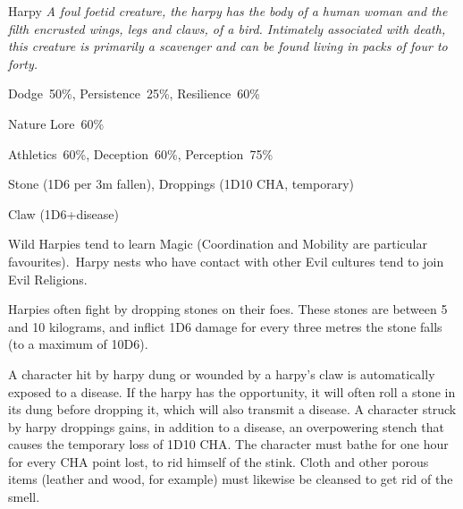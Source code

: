\begin{monsterbox}{Harpy}
	\textit{A foul foetid creature, the harpy has the body of a human woman and the filth encrusted wings, legs and claws, of a bird. Intimately associated with death, this creature is primarily a scavenger and can be found living in packs of four to forty.}\\
	\rpghline
	\basics[%
        hitpoints  = 9,
	majorwound = 5,
	damagemodifier = 0,
	powerpoints = 11,
	movementrate = {15m, 30m when flying},
	armor = None,
	plunderrating = 3
	]
	\rpghline%
	\stats[ %
		STR = 3D6    (11),
		CON = 3D6    (11),
		DEX = 5D6    (18),
		SIZ = 2D6    (7),
		INT = 3D6    (11),
		POW = 3D6    (11),
		CHA = 1D6    (4)
	]
	\rpghline%
	\begin{rpg-monsteraction}[Resistances]
		Dodge~50\%, Persistence~25\%, Resilience~60\%
	\end{rpg-monsteraction}
	\begin{rpg-monsteraction}[Knowledge]
		Nature Lore~60\%
	\end{rpg-monsteraction}
	\begin{rpg-monsteraction}[Practical]
		Athletics~60\%, Deception~60\%, Perception~75\%
	\end{rpg-monsteraction}
	\begin{rpg-monsteraction}
		Stone (1D6 per 3m fallen), Droppings (1D10 CHA, temporary)
	\end{rpg-monsteraction}
	\begin{rpg-monsteraction}
		Claw (1D6+disease)
	\end{rpg-monsteraction}
	\begin{rpg-monsteraction}[Magic]
		Wild Harpies tend to learn Magic (Coordination and Mobility are particular favourites). Harpy nests who have contact with other Evil cultures tend to join Evil Religions.
	\end{rpg-monsteraction}
	\begin{rpg-monsteraction}
		Harpies often fight by dropping stones on their foes. These stones are between 5 and 10 kilograms, and inflict 1D6 damage for every three metres the stone falls (to a maximum of 10D6). 
	\end{rpg-monsteraction}
	\begin{rpg-monsteraction}
		A character hit by harpy dung or wounded by a harpy’s claw is automatically exposed to a disease. If the harpy has the opportunity, it will often roll a stone in its dung before dropping it, which will also transmit a disease. A character struck by harpy droppings gains, in addition to a disease, an overpowering stench that causes the temporary loss of 1D10 CHA. The character must bathe for one hour for every CHA point lost, to rid himself of the stink. Cloth and other porous items (leather and wood, for example) must likewise be cleansed to get rid of the smell.

\end{rpg-monsteraction}
\end{monsterbox}
